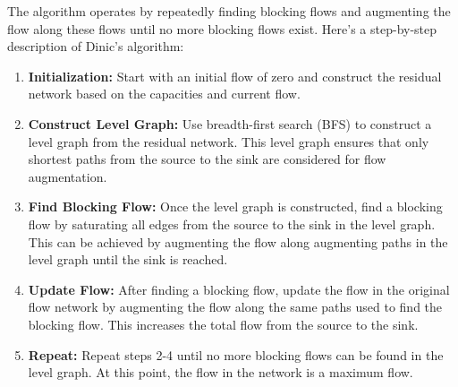 \documentclass[12pt]{book} %
\begin{document}
The algorithm operates by repeatedly finding blocking flows and augmenting the flow along these flows until no more blocking flows exist. Here's a step-by-step description of Dinic's algorithm:

\begin{enumerate}
    \item \textbf{Initialization:} Start with an initial flow of zero and construct the residual network based on the capacities and current flow.
    
    \item \textbf{Construct Level Graph:} Use breadth-first search (BFS) to construct a level graph from the residual network. This level graph ensures that only shortest paths from the source to the sink are considered for flow augmentation.
    
    \item \textbf{Find Blocking Flow:} Once the level graph is constructed, find a blocking flow by saturating all edges from the source to the sink in the level graph. This can be achieved by augmenting the flow along augmenting paths in the level graph until the sink is reached.
    
    \item \textbf{Update Flow:} After finding a blocking flow, update the flow in the original flow network by augmenting the flow along the same paths used to find the blocking flow. This increases the total flow from the source to the sink.
    
    \item \textbf{Repeat:} Repeat steps 2-4 until no more blocking flows can be found in the level graph. At this point, the flow in the network is a maximum flow.
\end{enumerate}
\end{document}
